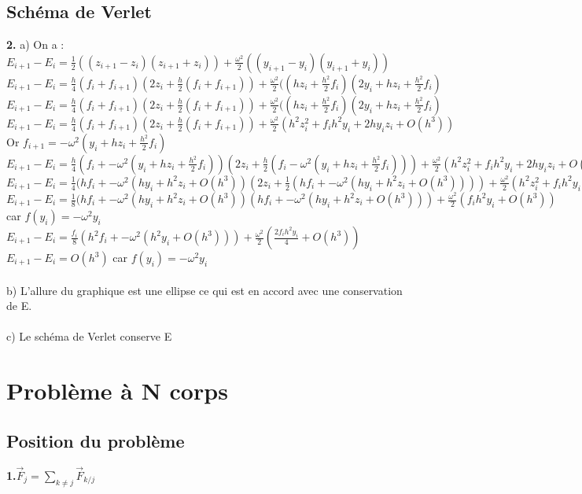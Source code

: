 \documentclass{article}
\begin{document}
\subsection{Schéma de Verlet}

{\bf 2.} a) On a : \\
$E_{i+1}-E_i =\frac{1}{2} ((z_{i+1} -z_i) (z_{i+1} +z_i)) + \frac{\omega^2}{2}((y_{i+1}-y_i)(y_{i+1}+y_i)) $ \\
$E_{i+1}-E_i =\frac{h}{4}(f_i + f_{i+1})(2z_i +\frac{h}{2}(f_i+f_{i+1})) + \frac{\omega^2}{2}((hz_i + \frac{h^2}{2}f_i)(2y_i+hz_i + \frac{h^2}{2}f_i)$ \\
$E_{i+1}-E_i =\frac{h}{4}(f_i + f_{i+1})(2z_i +\frac{h}{2}(f_i+f_{i+1})) + \frac{\omega^2}{2}((hz_i + \frac{h^2}{2}f_i)(2y_i+hz_i + \frac{h^2}{2}f_i)$ \\
$E_{i+1}-E_i =\frac{h}{4}(f_i + f_{i+1})(2z_i +\frac{h}{2}(f_i+f_{i+1})) + \frac{\omega^2}{2}(h^2z_i^2+f_ih^2y_i+2hy_iz_i +O(h^3))$ \\
Or $f_{i+1}=-\omega^2(y_i+hz_i+\frac{h^2}{2}f_i)$ \\
$E_{i+1}-E_i =\frac{h}{4}(f_i + -\omega^2(y_i+hz_i+\frac{h^2}{2}f_i))(2z_i +\frac{h}{2}(f_i-\omega^2(y_i+hz_i+\frac{h^2}{2}f_i))) + \frac{\omega^2}{2}(h^2z_i^2+f_ih^2y_i+2hy_iz_i +O(h^3))$ \\
$E_{i+1}-E_i =\frac{1}{4}(hf_i + -\omega^2(hy_i+h^2z_i+ O(h^3))(2z_i +\frac{1}{2}(hf_i+-\omega^2(hy_i+h^ 2z_i+ O(h^3)))) + \frac{\omega^2}{2}(h^2z_i^2+f_ih^2y_i+2hy_iz_i +O(h^3))$ \\
$E_{i+1}-E_i =\frac{1}{8}(hf_i + -\omega^2(hy_i+h^2z_i+ O(h^3))(hf_i+-\omega^2(hy_i+h^ 2z_i+ O(h^3))) + \frac{\omega^2}{2}(f_ih^2y_i+O(h^3))$ car $f(y_i)=-\omega^2 y_i$ \\
$E_{i+1}-E_i = \frac{f_i}{8}(h^2f_i+-\omega^2(h^2y_i+O(h^3))) + \frac{\omega^2}{2}(\frac{2f_ih^2y_i}{4}+O(h^3))$ \\
$E_{i+1}-E_i=O(h^3)$ car $f(y_i)=-\omega^2y_i$ \\
 \\
b) L'allure du graphique est une ellipse ce qui est en accord avec une conservation de E. \\
 \\
c) Le schéma de Verlet conserve E
\section{Problème à N corps}
\subsection{Position du problème}
{\bf 1.}$\vec F_j= \sum_{k \neq j} \vec F_{k/j}$

\end{document}
